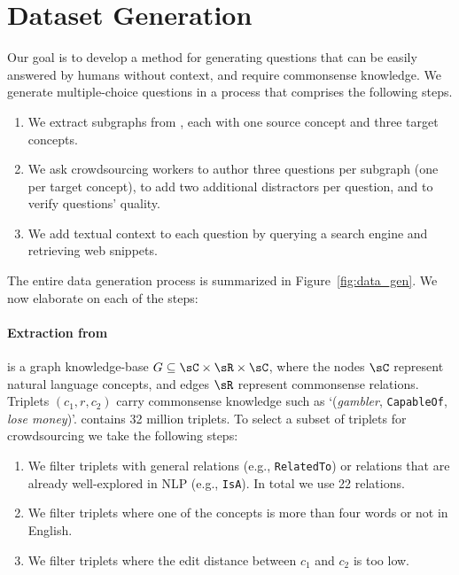 \nocite{Tange2011a}

\section{Dataset Generation}
\label{sec:data_gen}

Our goal is to develop a method for generating questions that can be easily answered by humans without context, and require commonsense knowledge. We generate multiple-choice questions in a process that comprises the following steps.

\begin{enumerate}[topsep=0pt,itemsep=0ex,parsep=0ex]
    \item We extract subgraphs from \conceptnet{}, each with one source concept and three target concepts.
    \item We ask crowdsourcing workers to author three questions per subgraph (one per target concept), to add two additional distractors per question, and to verify questions' quality.
    \item We add textual context to each question by querying a search engine and retrieving web snippets.
\end{enumerate}

The entire data generation process is summarized in Figure~\ref{fig:data_gen}.
We now elaborate on each of the steps:

\paragraph{Extraction from \conceptnet{}}
\conceptnet{} is a graph knowledge-base $G \subseteq \sC \times \sR \times \sC$, where the nodes $\sC$ represent natural language concepts, and edges $\sR$ represent commonsense relations. Triplets $(c_1, r, c_2)$ carry commonsense knowledge such as `(\emph{gambler}, \texttt{CapableOf}, \emph{lose money})'. \conceptnet{} contains 32 million triplets. To select a subset of triplets for crowdsourcing we take the following steps:

\begin{enumerate}[topsep=0pt,itemsep=0ex,parsep=0ex]
    \item We filter triplets with general relations (e.g., \texttt{RelatedTo}) or relations that are already well-explored in NLP (e.g., \texttt{IsA}). In total we use 22 relations.
    \item We filter triplets where one of the concepts is more than four words or not in English.
    \item We filter triplets where the edit distance between $c_1$ and $c_2$ is too low.
\end{enumerate}

